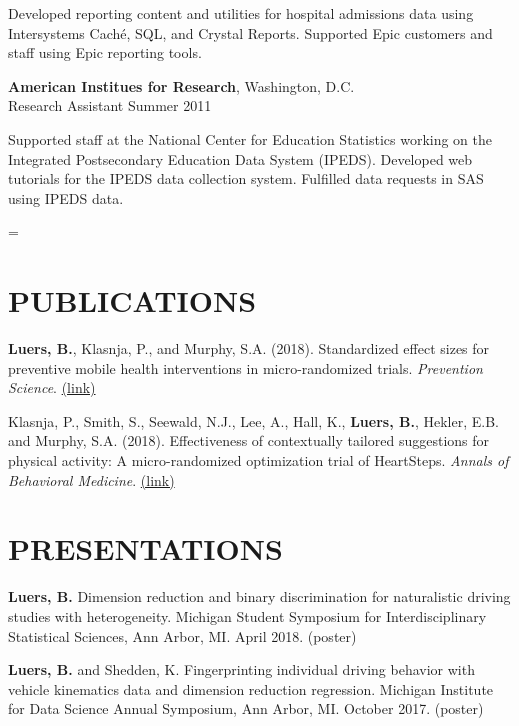 \documentclass[letterpaper, 11pt]{article}
\newenvironment{absolutelynopagebreak}
  {\par\nobreak\vfil\penalty0\vfilneg
   \vtop\bgroup}
  {\par\xdef\tpd{\the\prevdepth}\egroup
   \prevdepth=\tpd}
\begin{document}
{\addtolength{\leftskip}{15pt}
 Developed reporting content and utilities for hospital
  admissions data using Intersystems
  Cach\'{e}, SQL, and Crystal Reports.
 Supported Epic customers and
  staff using Epic reporting tools.

}

\begin{absolutelynopagebreak}
{\bf American Institues for Research}, Washington, D.C.\\
Research Assistant \hfill Summer 2011

{\addtolength{\leftskip}{15pt}
    Supported staff at the National Center for Education Statistics
   working on the Integrated Postsecondary Education Data System
   (IPEDS).
 Developed web tutorials for the IPEDS data collection
   system.
 Fulfilled data requests in SAS using IPEDS data.


}

\end{absolutelynopagebreak}

\section{PUBLICATIONS}

\textbf{Luers, B.}, Klasnja, P., and Murphy, S.A. (2018). Standardized effect sizes for preventive mobile health interventions in micro-randomized trials. \textit{Prevention Science}. \href{https://doi.org/10.1007/s11121-017-0862-5}{(link)}

Klasnja, P., Smith, S., Seewald, N.J., Lee, A., Hall, K., \textbf{Luers, B.}, Hekler, E.B. and Murphy, S.A. (2018). Effectiveness of contextually tailored suggestions for physical activity: A micro-randomized optimization trial of HeartSteps. \textit{Annals of Behavioral Medicine}. \href{https://doi.org/10.1093/abm/kay067}{(link)}

\section{PRESENTATIONS}

\textbf{Luers, B.} Dimension reduction and binary discrimination for naturalistic driving studies with heterogeneity. Michigan Student Symposium for Interdisciplinary Statistical Sciences, Ann Arbor, MI. April 2018. (poster)

\textbf{Luers, B.} and Shedden, K. Fingerprinting individual driving behavior with vehicle kinematics data and dimension reduction regression. Michigan Institute for Data Science Annual Symposium, Ann Arbor, MI. October 2017. (poster)
\end{document}
